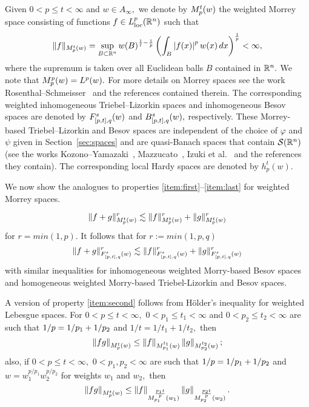 { Given $0<p\le t<\infty$ and $w\in A_\infty,$  we denote by $\mow{p}{t}{w}$ the weighted Morrey space consisting of functions $f\in L^p_{\text{loc}}(\rn)$  such that
\[
\|f\|_{\mow{p}{t}{w}}=\sup_{B\subset \rn}w(B)^{\frac{1}{t}-\frac{1}{p}}\left( \int_B\abs{f(x)}^pw(x)\dx\right)^\frac{1}{p}<\infty,
\]
where the supremum is taken over all Euclidean balls $B$ contained in $\rn.$ We note that $\mow{p}{p}{w}=\lebw{p}{w}.$ For more details on Morrey spaces see the work Rosenthal--Schmeisser~\cite{MR3538648} and the references contained therein. The corresponding weighted inhomogeneous Triebel--Lizorkin spaces and inhomogeneous Besov spaces  are denoted by $\itlw{[p,t]}{s}{q}{w}$ and   $\ibesw{[p,t]}{s}{q}{w},$ respectively. These Morrey-based Triebel--Lizorkin and Besov  spaces are independent of the choice of $\varphi$ and $\psi$ given in  Section~\ref{sec:spaces} and are quasi-Banach spaces that contain $\sw$ (see the works Kozono--Yamazaki~\cite{MR1274547}, Mazzucato~\cite{MR1946395}, Izuki et al.~\cite{MR2792058} and the references they contain). The corresponding local Hardy spaces are denoted by $h^t_p(w).$ 

We now show the analogues to properties \ref{item:first}--\ref{item:last} for weighted Morrey spaces.

\[\|f+g\|^r_{\mow{p}{t}{w}} \lesssim \|f\|^r_{\mow{p}{t}{w}} + \|g\|^r_{\mow{p}{t}{w}} \]
for $r = min(1,p)$. It follows that for $r :=min(1,p,q)$ 
\[ \|f+g\|^r_{\itlw{[p,t]}{s}{q}{w}} \lesssim \|f\|^r_{\itlw{[p,t]}{s}{q}{w}} + \|g\|^r_{\itlw{[p,t]}{s}{q}{w}} \]
with similar inequalities for inhomogeneous weighted Morry-based Besov spaces and homogeneous weighted Morry-based Triebel-Lizorkin and Besov spaces.

A version of property \ref{item:second} follows from H\"older's inequality for weighted Lebesgue spaces. For $0<p\le t<\infty,$ $0<p_1\le t_1<\infty$ and $0<p_2\le t_2<\infty$ are such that $\hcline$ and $1/t=1/t_1+1/t_2,$ then  
\begin{equation*}
\norm{fg}{\mow{p}{t}{w}}\le \norm{f}{\mow{p_1}{t_1}{w}} \norm{g}{\mow{p_2}{t_2}{w}};
\end{equation*}
also, if $0<p\le t<\infty,$ $0<p_1,p_2<\infty$ are such that $\hcline$ and $w=w_1^{p/p_1}w_2^{p/p_2}$ for weights $w_1$ and $w_2,$ then 
\begin{equation*}
\norm{fg}{\mow{p}{t}{w}}\le \norm{f}{\mow{p_1}{\frac{p_1t}{p}}{w_1}} \norm{g}{\mow{p_2}{\frac{p_2t}{p}}{w_2}}.
\end{equation*}

}
